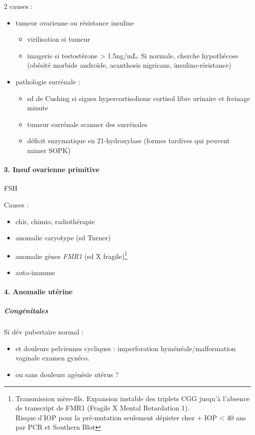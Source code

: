 \documentclass[11pt]{article}
\begin{document}
2 causes :
\begin{itemize}
\item tumeur ovarienne ou résistance insuline
\begin{itemize}
\item virilisation si tumeur
\item imagerie si testostérone > 1.5ng/mL. Si normale, cherche hypothécose
(obésité morbide androïde, acanthosis nigricans, insulino-résistance)
\end{itemize}
\item pathologie surrénale :
\begin{itemize}
\item sd de Cushing si signes hypercortisolisme \thus cortisol libre urinaire et
freinage minute
\item tumeur surrénale \thus scanner des surrénales
\item déficit enzymatique en 21-hydroxylase (\danger formes tardives qui peuvent
mimer SOPK)
\end{itemize}
\end{itemize}

\paragraph{3. Insuf ovarienne primitive}
\label{sec:org0a0a3fa}
\inc FSH

Causes :
\begin{itemize}
\item chir, chimio, radiothérapie
\item anomalie caryotype (sd Turner)
\item anomalie gènes \emph{FMR1} (sd X fragile)\footnote{Transmission mère-fils. Expansion instable des triplets CGG jusqu'à
l'absence de transcript de FMR1 (Fragile X Mental Retardation 1). \\
\danger Risque d'IOP pour la pré-mutation seulement \thus dépister chez
\female + IOP < 40 ans par PCR et Southern Blot}
\item auto-immune
\end{itemize}

\paragraph{4. Anomalie utérine}
\label{sec:org360a9f2}
\subparagraph{Congénitales}
\label{sec:org7ccaaf3}
Si dév pubertaire normal :
\begin{itemize}
\item et douleurs pelviennes cycliques :  imperforation hyménéale/malformation vaginale \thus examen gynéco.
\item ou sans douleurs \thus agénésie utérus ?
\end{itemize}
\end{document}
